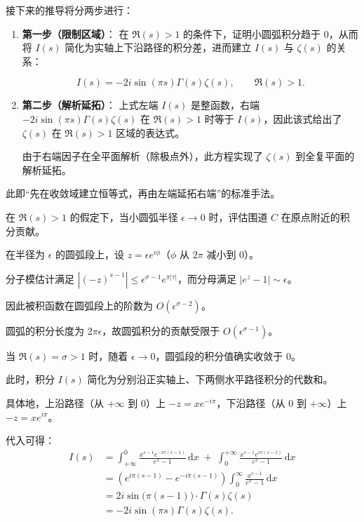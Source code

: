 接下来的推导将分两步进行：
\begin{enumerate}
  \item \textbf{第一步（限制区域）}：
  在 $\Re(s)>1$ 的条件下，证明小圆弧积分趋于 $0$，从而将 $I(s)$ 简化为实轴上下沿路径的积分差，进而建立 $I(s)$ 与 $\zeta(s)$ 的关系：

  \[
    I(s) = -2i\sin(\pi s)\Gamma(s)\zeta(s),\qquad \Re(s)>1.
  \]
  \item \textbf{第二步（解析延拓）}：
  上式左端 $I(s)$ 是整函数，右端 $-2i\sin(\pi s)\Gamma(s)\zeta(s)$ 在 $\Re(s)>1$ 时等于 $I(s)$，因此该式给出了 $\zeta(s)$ 在 $\Re(s)>1$ 区域的表达式。

  由于右端因子在全平面解析（除极点外），此方程实现了 $\zeta(s)$ 到全复平面的解析延拓。
\end{enumerate}

此即“先在收敛域建立恒等式，再由左端延拓右端”的标准手法。

在 $\Re(s)>1$ 的假定下，当小圆弧半径 $\epsilon \to 0$ 时，评估围道 $C$ 在原点附近的积分贡献。

在半径为 $\epsilon$ 的圆弧段上，设 $z = \epsilon e^{i\phi}$（$\phi$ 从 $2\pi$ 减小到 $0$）。

分子模估计满足 $|(-z)^{s-1}| \le \epsilon^{\sigma-1} e^{\pi |\tau|}$，而分母满足 $|e^z - 1| \sim \epsilon$。

因此被积函数在圆弧段上的阶数为 $O(\epsilon^{\sigma-2})$。

圆弧的积分长度为 $2\pi \epsilon$，故圆弧积分的贡献受限于 $O(\epsilon^{\sigma-1})$。

当 $\Re(s) = \sigma > 1$ 时，随着 $\epsilon \to 0$，圆弧段的积分值确实收敛于 $0$。

此时，积分 $I(s)$ 简化为分别沿正实轴上、下两侧水平路径积分的代数和。

具体地，上沿路径（从 $+\infty$ 到 $0$）上 $-z = x e^{-i\pi}$，下沿路径（从 $0$ 到 $+\infty$）上 $-z = x e^{i\pi}$。

代入可得：
\begin{align*}
  I(s) &=  \int_{+\infty}^{0} \frac{x^{s-1} e^{-i\pi(s-1)}}{e^x - 1} \,\mathrm{d}x \;+\;  \int_{0}^{+\infty} \frac{x^{s-1} e^{i\pi(s-1)}}{e^x - 1} \,\mathrm{d}x \\
  &= \left( e^{i\pi(s-1)} - e^{-i\pi(s-1)} \right)  \int_0^{\infty} \frac{x^{s-1}}{e^x - 1} \,\mathrm{d}x \\
  &= 2i \sin\big(\pi(s-1)\big) \cdot \Gamma(s)\zeta(s) \\
  &= -2i \sin(\pi s) \Gamma(s) \zeta(s).
\end{align*}


